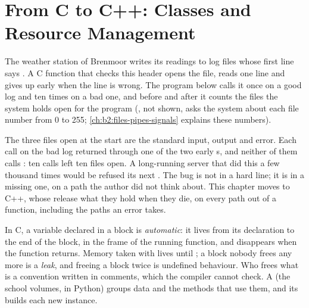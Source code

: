 \chapter{From C to C++: Classes and Resource Management}\label{ch:b2:cpp-classes-raii}

The weather station of Brenmoor writes its readings to log files whose first line says . A C
function that checks this header opens the file, reads one line and gives up early when the line is wrong. The
program below calls it once on a good log and ten times on a bad one, and before and after it counts the files the
system holds open for the program (, not shown, asks the system about each file number from 0 to 255;
\cref{ch:b2:files-pipes-signals} explains these numbers).

\label{lst:b2:cpp-classes-raii:early-return}

\label{out:b2:cpp-classes-raii:early-return}

The three files open at the start are the standard input, output and error. Each call on the bad log returned
through one of the two early s, and neither of them calls : ten calls left ten files open.
A long-running server that did this a few thousand times would be refused its next . The bug is not
in a hard line; it is in a missing one, on a path the author did not think about. This chapter moves to C++, whose
 release what they hold when they die, on every path out of a function, including the paths an error
takes.

\begin{recall}
In C, a variable declared in a block is \emph{automatic}: it lives from its declaration to the end of the block,
in the frame of the running function, and disappears when the function returns. Memory taken with 
lives until ; a block nobody frees any more is a \emph{leak}, and freeing a block twice is undefined
behaviour. Who frees what is a convention written in comments, which the compiler cannot check. A \emph{}
(the school volumes, in Python) groups data and the methods that use them, and its  builds each new
instance.
\end{recall}

